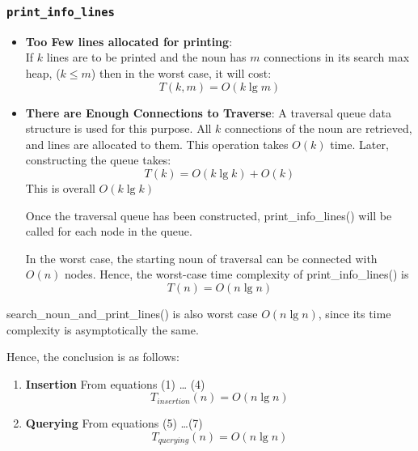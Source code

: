 \documentclass[conference]{IEEEtran}
\begin{document}
\subsubsection{\textbf{\texttt{print\_info\_lines}}}
    \begin{itemize}
        \item \textbf{Too Few lines allocated for printing}: 
\\If $k$ lines are to be printed
and the noun has $m$ connections in its search max heap, ($k \leq m$)
then in the worst case, it will cost:
\begin{equation}
	T(k, m) = O(k\lg m)
\end{equation}

\item \textbf{There are Enough Connections to Traverse}: 
A traversal queue data structure is used for this purpose.
All $k$ connections of the noun are retrieved, and lines are
allocated to them. This operation takes $O(k)$ time. Later,
constructing the queue takes:
\begin{equation}
    T(k) = O(k\lg k) + O(k)
\end{equation}
This is overall $O(k\lg k)$

Once the traversal queue has been constructed, print\_info\_lines() will be called for each node
in the queue.

In the worst case, the starting noun of traversal can be connected with $O(n)$ nodes. Hence, the worst-case time complexity of print\_info\_lines() is
\begin{equation}
    T(n) = O(n\lg n)
\end{equation}
\end{itemize}

search\_noun\_and\_print\_lines() is also worst case $O(n \lg n)$, since its time complexity is asymptotically the same.

Hence, the conclusion is as follows:
\begin{enumerate}
    \item \textbf{Insertion} From equations (1) \ldots 
 \space (4)
    \begin{equation*}
        T_{insertion}(n) = O(n\lg n) 
    \end{equation*}

    \item \textbf{Querying} From equations (5) \ldots \space (7) 
    \begin{equation*}
        T_{querying}(n) = O(n\lg n) 
    \end{equation*}
\end{enumerate}
\end{document}
